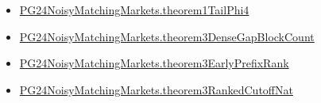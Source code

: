 \documentclass[10pt]{article}
\begin{document}
\begin{itemize}
\item \hyperlink{governing-declaration-8b3a32b21e12511f}{PG24\allowbreak{}Noisy\allowbreak{}Matching\allowbreak{}Markets.\allowbreak{}theorem1\allowbreak{}Tail\allowbreak{}Phi4}
\item \hyperlink{governing-declaration-b7800b4792933f3e}{PG24\allowbreak{}Noisy\allowbreak{}Matching\allowbreak{}Markets.\allowbreak{}theorem3\allowbreak{}Dense\allowbreak{}Gap\allowbreak{}Block\allowbreak{}Count}
\item \hyperlink{governing-declaration-2c7383ab7c4386a1}{PG24\allowbreak{}Noisy\allowbreak{}Matching\allowbreak{}Markets.\allowbreak{}theorem3\allowbreak{}Early\allowbreak{}Prefix\allowbreak{}Rank}
\item \hyperlink{governing-declaration-b5b9b3206590b33e}{PG24\allowbreak{}Noisy\allowbreak{}Matching\allowbreak{}Markets.\allowbreak{}theorem3\allowbreak{}Ranked\allowbreak{}Cutoff\allowbreak{}Nat}
\end{itemize}
\end{document}
